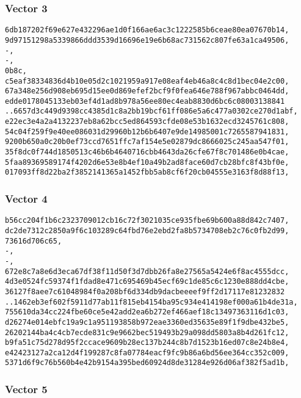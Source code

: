 \documentclass[
]{article}
\begin{document}
\subsubsection{Vector 3}\label{vector-3-1}

\begin{verbatim}
6db187202f69e627e432296ae1d0f166ae6ac3c1222585b6ceae80ea07670b14,
9d97151298a5339866ddd3539d16696e19e6b68ac731562c807fe63a1ca49506,
-,
-,
0b8c,
c5eaf38334836d4b10e05d2c1021959a917e08eaf4eb46a8c4c8d1bec04e2c00,
67a348e256d908eb695d15ee0d869efef2bcf9f0fea646e788f967abbc0464dd,
edde0178045133eb03ef4d1ad8b978a56ee80ec4eab8830d6bc6c08003138841
..6657d3c449d9398cc4385d1c8a2bb19bcf61ff086e5a6c477a0302ce270d1abf,
e22ec3e4a2a4132237eb8a62bcc5ed864593cfde08e53b1632ecd3245761c808,
54c04f259f9e40ee086031d29960b12b6b6407e9de14985001c7265587941831,
9200b650a0c20b0ef73ccd7651ffc7af154e5e02879dc8666025c245aa547f01,
35f8dc0f744d1850513c46b6b4640716cbb4643da26cfe67f8c701486e0b4cae,
5faa89369589174f4202d6e53e8b4ef10a49b2ad8face60d7cb28bfc8f43bf0e,
017093ff8d22ba2f3852141365a1452fbb5ab8cf6f20cb04555e3163f8d88f13,
\end{verbatim}

\subsubsection{Vector 4}\label{vector-4-1}

\begin{verbatim}
b56cc204f1b6c2323709012cb16c72f3021035ce935fbe69b600a88d842c7407,
dc2de7312c2850a9f6c103289c64fbd76e2ebd2fa8b5734708eb2c76c0fb2d99,
73616d706c65,
-,
-,
672e8c7a8e6d3eca67df38f11d50f3d7dbb26fa8e27565a5424e6f8ac4555dcc,
4d3e0524fc59374f1fdad8e471c695469b45ecf69c1de85c6c1230e888dd4cbe,
36127f8aee7c61048984f0a208bf6d334db9dacbeeeef9ff2d17117e81232832
..1462eb3ef602f5911d77ab11f815eb4154ba95c934e414198ef000a61b4de31a,
755610da34cc224fbe60ce5e42add2ea6b272ef466aef18c13497363116d1c03,
d26274e014ebfc19a9c1a951193858b972eae3360ed35635e89f1f9dbe432be5,
26202144ba4c4cb7ecde831c9e9662bec519493b29a098dd5803a8b4d261fc12,
b9fa51c75d278d95f2ccace9609b28ec137b244c8b7d1523b16ed07c8e24b8e4,
e42423127a2ca12d4f199287c8fa07784eacf9fc9b86a6bd56ee364cc352c009,
5371d6f9c76b560b4e42b9154a395bed60924d8de31284e926d06af382f5ad1b,
\end{verbatim}

\subsubsection{Vector 5}\label{vector-5-1}
\end{document}
